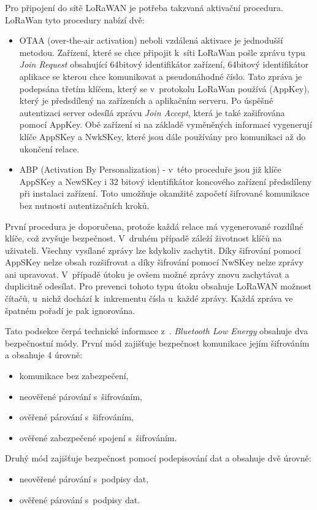 Pro připojení do sítě LoRaWAN je potřeba takzvaná aktivační procedura. LoRaWan tyto procedury nabízí dvě:
\begin{itemize}
    \item OTAA (over-the-air activation) neboli vzdálená aktivace je jednodušší metodou. Zařízení, které se chce připojit k~síti LoRaWan pošle zprávu typu \textit{Join Request} obsahující 64bitový identifikátor zařízení, 64bitový identifikátor aplikace se kterou chce komunikovat a pseudonáhodné číslo. Tato zpráva je podepsána třetím klíčem, který se v~protokolu LoRaWan používá (AppKey), který je předsdílený na zařízeních a aplikačním serveru. Po úspěšné autentizaci server odesílá zprávu \textit{Join Accept}, která je také zašifrována pomocí AppKey. Obě zařízení si na základě vyměněných informací vygenerují klíče AppSKey a NwkSKey, které jsou dále používány pro komunikaci až do ukončení relace.
    \item ABP (Activation By Personalization) - v~této proceduře jsou již klíče AppSKey a NewSKey i 32 bitový identifikátor koncového zařízení předsdíleny při instalaci zařízení. Toto umožňuje okamžité započetí šifrované komunikace bez nutnosti autentizačních kroků.
\end{itemize}


První procedura je doporučena, protože každá relace má vygenerované rozdílné klíče, což zvyšuje bezpečnost. V~druhém případě záleží životnost klíčů na uživateli. Všechny vysílané zprávy lze kdykoliv zachytit. Díky šifrování pomocí AppSKey nelze obsah rozšifrovat a díky šifrování pomocí NwSKey nelze zprávy ani upravovat. V~případě útoku je ovšem možné zprávy znovu zachytávat a duplicitně odesílat. Pro prevenci tohoto typu útoku obsahuje LoRaWAN možnost čítačů, u~nichž dochází k~inkrementu čísla u~každé zprávy. Každá zpráva ve špatném pořadí je pak ignorována.


Tato podsekce čerpá technické informace z~\cite{BLE_BIB}. \textit{Bluetooth Low Energy} obsahuje dva bezpečnostní módy. První mód zajišťuje bezpečnost komunikace jejím šifrováním a obsahuje 4 úrovně:
\begin{itemize}
    \item komunikace bez zabezpečení,
    \item neověřené párování s~šifrováním,
    \item ověřené párování s~šifrováním,
    \item ověřené zabezpečené spojení s~šifrováním. 
\end{itemize}
Druhý mód zajišťuje bezpečnost pomocí podepisování dat a obsahuje dvě úrovně:
\begin{itemize}
    \item neověřené párování s~podpisy dat,
    \item ověřené párování s~podpisy dat.
\end{itemize}

